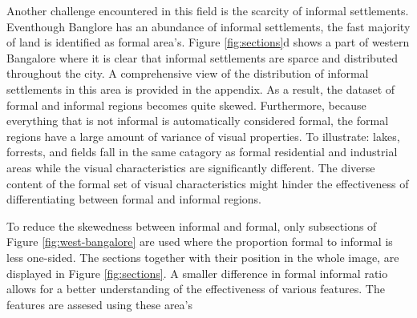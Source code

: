 Another challenge encountered in this field is the scarcity of informal
settlements.  Eventhough Banglore  has an abundance of informal settlements,
the fast majority of land is identified as formal area's. Figure
\ref{fig:sections}d shows a part of western Bangalore where it is clear
that informal settlements are sparce and distributed throughout the city. A comprehensive view of the distribution of informal settlements in this area is provided in the appendix. As
a result, the dataset of formal and informal regions becomes quite skewed.
Furthermore, because everything that is not informal is automatically
considered formal, the formal regions have a large amount of variance of visual
properties.  To illustrate: lakes, forrests, and fields fall in the same
catagory as formal residential and industrial areas while the visual
characteristics are significantly different. The diverse content of the formal
set of visual characteristics might hinder the effectiveness of differentiating
between formal and informal regions. 

To reduce the skewedness between informal and formal, only subsections of
Figure \ref{fig:west-bangalore} are used where the proportion formal to
informal is less one-sided. The sections together with their position in the whole image, are displayed in Figure \ref{fig:sections}. A smaller difference in formal informal ratio allows for
a better understanding of the effectiveness of various features. The features
are assesed using these area's 



